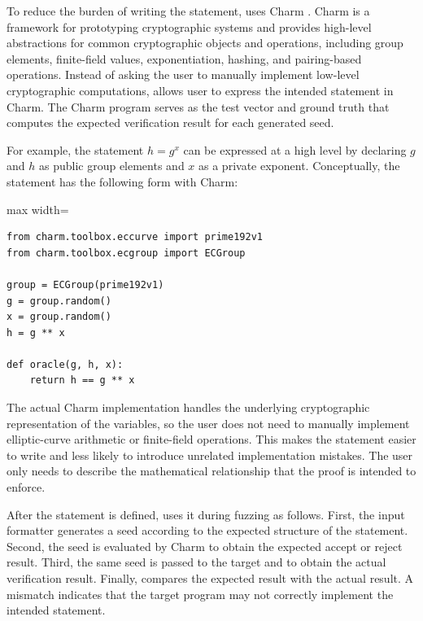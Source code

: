 To reduce the burden of writing the \zksnark statement, \greyboxfuzz uses Charm \cite{akinyele2013charm}. Charm is a framework for prototyping cryptographic systems and provides high-level abstractions for common cryptographic objects and operations, including group elements, finite-field values, exponentiation, hashing, and pairing-based operations. Instead of asking the user to manually implement low-level cryptographic computations, \greyboxfuzz allows user to express the intended statement in Charm. The Charm program serves as the test vector and ground truth that computes the expected verification result for each generated seed.

For example, the statement $h = g^x$ can be expressed at a high level by declaring $g$ and $h$ as public group elements and $x$ as a private exponent. Conceptually, the statement has the following form with Charm:

\begin{ZZlisting}[H]
\centering
\begin{adjustbox}{max width=\textwidth}
\begin{CenteredBox}
\begin{minipage}{0.96\textwidth}
\begin{lstlisting}[style=pythonstyle]
from charm.toolbox.eccurve import prime192v1
from charm.toolbox.ecgroup import ECGroup

group = ECGroup(prime192v1)
g = group.random()
x = group.random()
h = g ** x

def oracle(g, h, x):
    return h == g ** x

\end{lstlisting}
\end{minipage}
\end{CenteredBox}
\end{adjustbox}
\caption{An example of Charm implementation}
\label{list:charm}
\end{ZZlisting}


The actual Charm implementation handles the underlying cryptographic representation of the variables, so the user does not need to manually implement elliptic-curve arithmetic or finite-field operations. This makes the statement easier to write and less likely to introduce unrelated implementation mistakes. The user only needs to describe the mathematical relationship that the proof is intended to enforce.

After the statement is defined, \greyboxfuzz uses it during fuzzing as follows. First, the input formatter generates a seed according to the expected structure of the statement. Second, the seed is evaluated by Charm to obtain the expected accept or reject result. Third, the same seed is passed to the target \pprog and \vprog to obtain the actual verification result. Finally, \greyboxfuzz compares the expected result with the actual result. A mismatch indicates that the target \zksnark program may not correctly implement the intended statement.


